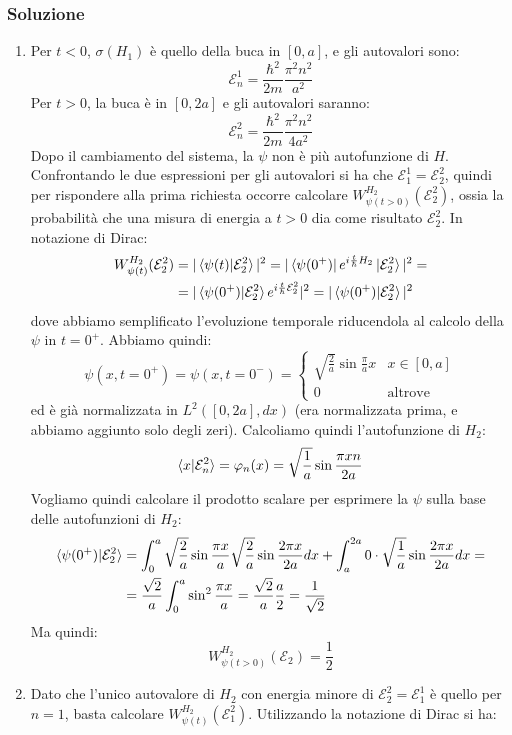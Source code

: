 \documentclass[../../FisicaTeorica.tex]{subfiles}
\begin{document}
\subsubsection{Soluzione}
\begin{enumerate}
\item Per $t<0$, $\sigma(H_1)$ è quello della buca in $[0,a]$, e gli autovalori sono:
\[
\mathcal{E}^1_n = \frac{\hbar^2}{2m}\frac{\pi^2 n^2}{a^2}
\]
Per $t>0$, la buca è in $[0,2a]$ e gli autovalori saranno:
\[
\mathcal{E}^2_n = \frac{\hbar^2}{2m}\frac{\pi^2 n^2}{4a^2}
\]
Dopo il cambiamento del sistema, la $\psi$ non è più autofunzione di $H$. Confrontando le due espressioni per gli autovalori si ha che $\mathcal{E}^1_1 = \mathcal{E}^2_2$, quindi per rispondere alla prima richiesta occorre calcolare $W_{\psi(t>0)}^{H_2} (\mathcal{E}_2^2)$, ossia la probabilità che una misura di energia a $t>0$ dia come risultato $\mathcal{E}_2^2$. In notazione di Dirac:
\begin{align*}
W_{\psi(t)}^{H_2}(\mathcal{E}_2^2)&=|\braket{\psi(t)|\mathcal{E}_2^2}|^2 = |\bra{\psi(0^+)}e^{i\frac{t}{\hbar}H_2}\ket{\mathcal{E}_2^2}|^2 = \\
&=|\braket{\psi(0^+)|\mathcal{E}^2_2} e^{i\frac{t}{\hbar}\mathcal{E}_2^2}|^2 = |\braket{\psi(0^+)|\mathcal{E}_2^2}|^2
\end{align*}
dove abbiamo semplificato l'evoluzione temporale riducendola al calcolo della $\psi$ in $t=0^+$.
Abbiamo quindi:
\[
\psi(x,t=0^+) = \psi(x,t=0^-) = \begin{cases}
\sqrt{\frac{2}{a}} \sin \frac{\pi}{a}x & x \in [0,a]\\
0 & \text{altrove}
\end{cases}
\]
ed è già normalizzata in $L^2([0,2a],dx)$ (era normalizzata prima, e abbiamo aggiunto solo degli zeri). Calcoliamo quindi l'autofunzione di $H_2$:
\[
\braket{x|\mathcal{E}_n^2}=\varphi_n(x)=\sqrt{\frac{1}{a}} \sin \frac{\pi x n}{2a}
\]
Vogliamo quindi calcolare il prodotto scalare per esprimere la $\psi$ sulla base delle autofunzioni di $H_2$:
\begin{align*}
\braket{\psi(0^+)|\mathcal{E}_2^2} &= \int_0^a \sqrt{\frac{2}{a}}\sin \frac{\pi x}{a} \sqrt{\frac{2}{a}}\sin \frac{2\pi x}{2a} dx +\int_a^{2a} 0\cdot \sqrt{\frac{1}{a}} \sin \frac{2\pi x}{2a}dx =\\
&= \frac{\sqrt{2}}{a}\int_0^a \sin^2 \frac{\pi x}{a}= \frac{\sqrt{2}}{a}\frac{a}{2}=\frac{1}{\sqrt{2}}
\end{align*}
Ma quindi:
\[
W^{H_2}_{\psi(t>0)}(\mathcal{E}_2) = \frac{1}{2}
\]
\item Dato che l'unico autovalore di $H_2$ con energia minore di $\mathcal{E}_2^2=\mathcal{E}_1^1$ è quello per $n=1$, basta calcolare $W^{H_2}_{\psi(t)}(\mathcal{E}_1^2)$. Utilizzando la notazione di Dirac si ha:

\end{enumerate}
\end{document}
